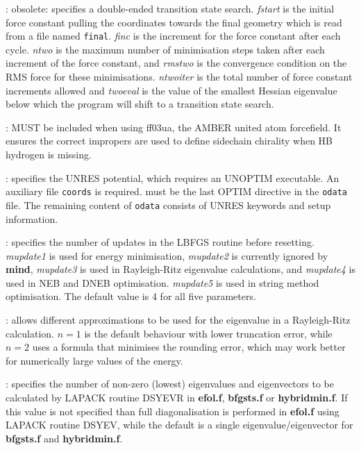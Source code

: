 {{{: obsolete: specifies a double-ended transition
state search. {\it fstart\/} is the initial force constant pulling the coordinates towards the final
geometry which is read from a file named {\tt final}. {\it finc\/} is the increment for the force 
constant after each cycle. {\it ntwo\/} is the maximum number of minimisation steps taken after each
increment of the force constant, and {\it rmstwo\/} is the convergence condition on the RMS force
for these minimisations. {\it ntwoiter\/} is the total number of force constant increments allowed
and {\it twoeval\/} is the value of the smallest Hessian eigenvalue below which the program will
shift to a transition state search.

: MUST be included when using ff03ua, the AMBER united atom forcefield. It ensures the correct impropers are used to define sidechain 
chirality when HB hydrogen is missing.

: specifies the UNRES potential, which requires an UNOPTIM executable.
An auxiliary file {\tt coords} is required. {} must be the last OPTIM directive in the
{\tt odata} file. The remaining content of {\tt odata} consists of UNRES keywords and
setup information.

: 
specifies the number of updates in the LBFGS routine before
      resetting. 
{\it mupdate1\/} is used for energy minimisation, 
{\it mupdate2\/} is currently ignored by {\bf mind},
{\it mupdate3\/} is used in Rayleigh-Ritz eigenvalue calculations, and 
{\it mupdate4\/} is used in NEB and DNEB optimisation. 
{\it mupdate5\/} is used in string method optimisation. 
The default value is 4 for all five parameters.

: allows different approximations to be used for the 
eigenvalue in a Rayleigh-Ritz {} calculation. $n=1$ is the default behaviour
with lower truncation error,
while $n=2$ uses a formula that minimises the rounding error, which may
work better for numerically large values of the energy.

: specifies the number of non-zero (lowest) eigenvalues and
eigenvectors to be calculated by LAPACK routine DSYEVR in {\bf efol.f},
{\bf bfgsts.f} or {\bf hybridmin.f}.
If this value is not specified than full diagonalisation is performed in 
{\bf efol.f} using LAPACK routine DSYEV, while the default is a single
eigenvalue/eigenvector for {\bf bfgsts.f} and {\bf hybridmin.f}.

}}}
